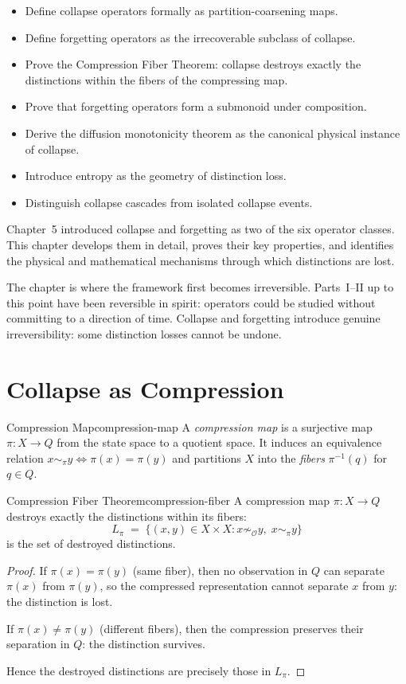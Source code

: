 \documentclass[12pt,twoside,openright]{book}
\newcommand{\distPairs}{X\times X}
\newcommand{\obs}{\mathcal{O}}
\newenvironment{objectives}{%
  \begin{tcolorbox}[colback=DistBlue!5,colframe=DistBlue,
    title={\faCheckCircle\enspace Chapter Objectives},
    fonttitle=\sffamily\bfseries\color{white},
    attach boxed title to top left={yshift=-2mm,xshift=4mm},
    boxed title style={colback=DistBlue},breakable]
  \begin{itemize}[leftmargin=*,nosep]}{%
  \end{itemize}\end{tcolorbox}\vspace{1em}}
\begin{document}
\begin{objectives}
\item Define collapse operators formally as partition-coarsening
  maps.
\item Define forgetting operators as the irrecoverable subclass
  of collapse.
\item Prove the Compression Fiber Theorem: collapse destroys
  exactly the distinctions within the fibers of the compressing
  map.
\item Prove that forgetting operators form a submonoid under
  composition.
\item Derive the diffusion monotonicity theorem as the canonical
  physical instance of collapse.
\item Introduce entropy as the geometry of distinction loss.
\item Distinguish collapse cascades from isolated collapse
  events.
\end{objectives}

Chapter~5 introduced collapse and forgetting as two of the six
operator classes. This chapter develops them in detail, proves
their key properties, and identifies the physical and
mathematical mechanisms through which distinctions are lost.

The chapter is where the framework first becomes irreversible.
Parts~I--II up to this point have been reversible in spirit:
operators could be studied without committing to a direction of
time. Collapse and forgetting introduce genuine irreversibility:
some distinction losses cannot be undone.

\section{Collapse as Compression}

\begin{definition}{Compression Map}{compression-map}
A \emph{compression map} is a surjective map
$\pi:X\to Q$ from the state space to a quotient space. It
induces an equivalence relation $x\sim_\pi y\Leftrightarrow
\pi(x)=\pi(y)$ and partitions $X$ into the \emph{fibers}
$\pi^{-1}(q)$ for $q\in Q$.
\end{definition}

\begin{theorem}{Compression Fiber Theorem}{compression-fiber}
A compression map $\pi:X\to Q$ destroys exactly the
distinctions within its fibers:
\[
  L_\pi
  \;=\;
  \{(x,y)\in\distPairs : x\not\sim_\obs y,\; x\sim_\pi y\}
\]
is the set of destroyed distinctions.
\begin{proof}
If $\pi(x)=\pi(y)$ (same fiber), then no observation in $Q$
can separate $\pi(x)$ from $\pi(y)$, so the compressed
representation cannot separate $x$ from $y$: the distinction
is lost.

If $\pi(x)\neq\pi(y)$ (different fibers), then the
compression preserves their separation in $Q$: the distinction
survives.

Hence the destroyed distinctions are precisely those in
$L_\pi$.
\end{proof}
\end{theorem}
\end{document}
